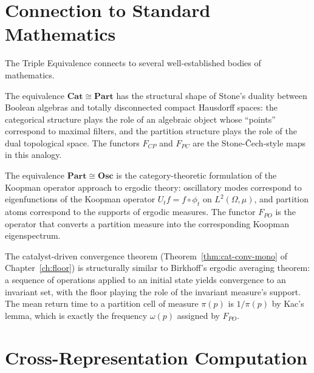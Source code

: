 \section{Connection to Standard Mathematics}
\label{sec:ch15-math}

The Triple Equivalence connects to several well-established bodies of
mathematics.

\begin{remark}
The equivalence $\mathbf{Cat} \cong \mathbf{Part}$ has the structural shape of
Stone's duality between Boolean algebras and totally disconnected compact
Hausdorff spaces: the categorical structure plays the role of an algebraic
object whose ``points'' correspond to maximal filters, and the partition
structure plays the role of the dual topological space.  The functors $F_{CP}$
and $F_{PC}$ are the Stone-\v{C}ech-style maps in this analogy.
\end{remark}

\begin{remark}
The equivalence $\mathbf{Part} \cong \mathbf{Osc}$ is the category-theoretic
formulation of the Koopman operator approach to ergodic theory: oscillatory
modes correspond to eigenfunctions of the Koopman operator
$U_t f = f \circ \phi_t$ on $L^2(\Omega, \mu)$, and partition atoms correspond
to the supports of ergodic measures.  The functor $F_{PO}$ is the operator that
converts a partition measure into the corresponding Koopman eigenspectrum.
\end{remark}

\begin{remark}
The catalyst-driven convergence theorem (Theorem~\ref{thm:cat-conv-mono} of
Chapter~\ref{ch:floor}) is structurally similar to Birkhoff's ergodic averaging
theorem: a sequence of operations applied to an initial state yields convergence
to an invariant set, with the floor playing the role of the invariant measure's
support.  The mean return time to a partition cell of measure $\pi(p)$ is
$1/\pi(p)$ by Kac's lemma, which is exactly the frequency $\omega(p)$ assigned
by $F_{PO}$.
\end{remark}

\section{Cross-Representation Computation}
\label{sec:ch15-cross-rep}


